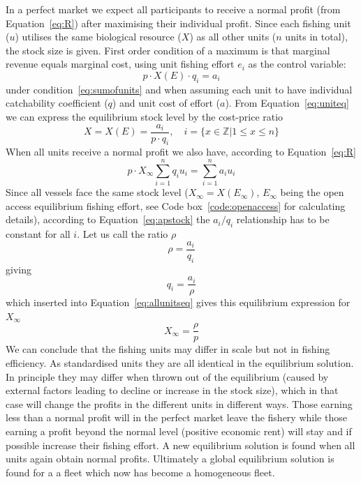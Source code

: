 \documentclass[11pt,fleqn]{book} %
\begin{document}
In a perfect market we expect all participants to receive a normal profit (from Equation~\ref{eq:R}) after maximising their individual profit. Since each fishing unit ($u$) utilises the same biological resource ($X$) as all other units ($n$ units in total), the stock size is given. First order condition of a maximum is that marginal revenue equals marginal cost, using unit fishing effort $e_i$ as the control variable:
\begin{equation} 
\label{eq:uniteq}
p \cdot X(E) \cdot q_i = a_i
\end{equation}
under condition~\ref{eq:sumofunits} and when assuming each unit to have individual catchability coefficient ($q$) and unit cost of effort ($a$). From Equation~\ref{eq:uniteq} we can express the equilibrium stock level by the cost-price ratio
\begin{equation} 
\label{eq:apstock}
X = X(E) = \frac{a_i}{p \cdot q_i}, \quad i = \{x \in \mathbb{Z} | 1 \leq x \leq n\}
\end{equation}
When all units receive a normal profit we also have, according to Equation~\ref{eq:R}
\begin{equation} 
\label{eq:allunitseq}
p \cdot X_\infty \sum_{i=1}^{n} q_i u_i = \sum_{i=1}^{n} a_i u_i
\end{equation}
Since all vessels face the same stock level ($X_\infty = X(E_\infty)$, $E_\infty$ being the open access equilibrium fishing effort, see Code box~\ref{code:openaccess} for calculating details), according to Equation~\ref{eq:apstock} the $a_i/q_i$ relationship has to be constant for all $i$. Let us call the ratio $\rho$
\begin{equation*} 
\rho = \frac{a_i}{q_i}
\end{equation*}
giving
\begin{equation} 
\label{eq:rho}
q_i = \frac{a_i}{\rho} 
\end{equation}
which inserted into Equation~\ref{eq:allunitseq} gives this equilibrium expression for $X_\infty$
\begin{equation} 
\label{eq:allunitseq2}
X_\infty = \frac{\rho}{p}
\end{equation}
We can conclude that the fishing units may differ in scale but not in fishing efficiency. As standardised units they are all identical in the equilibrium solution. In principle they may differ when thrown out of the equilibrium (caused by external factors leading to decline or increase in the stock size), which in that case will change the profits in the different units in different ways. Those earning less than a normal profit will in the perfect market leave the fishery while those earning a profit beyond the normal level (positive economic rent) will stay and if possible increase their fishing effort. A new equilibrium solution is found when all units again obtain normal profits. Ultimately a global equilibrium solution is found for a a fleet which now has become a homogeneous fleet.
\end{document}
